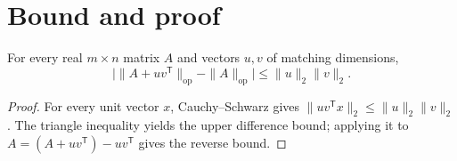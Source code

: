 \section{Bound and proof}
\begin{theorem}\label{thm:bound}
For every real $m\times n$ matrix $A$ and vectors $u,v$ of matching dimensions,
\[
 \big|\|A+uv^{\mathsf T}\|_{\mathrm{op}}-\|A\|_{\mathrm{op}}\big|
 \leq \|u\|_2\|v\|_2.
\]
\end{theorem}
\begin{proof}
For every unit vector $x$, Cauchy--Schwarz gives
$\|uv^{\mathsf T}x\|_2\leq\|u\|_2\|v\|_2$.
The triangle inequality yields the upper difference bound; applying it to
$A=(A+uv^{\mathsf T})-uv^{\mathsf T}$ gives the reverse bound.
\end{proof}
